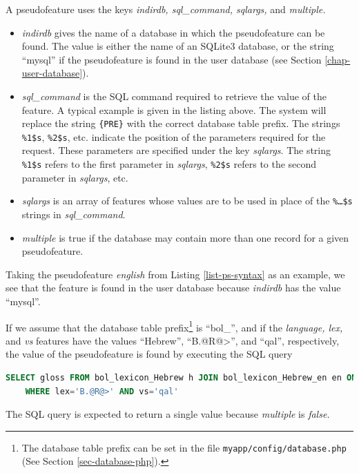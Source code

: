\documentclass[11pt,oneside,a4paper]{memoir}
\begin{document}
A pseudofeature uses the keys \emph{indirdb, sql\_command, sqlargs,} and \emph{multiple.}

\begin{itemize}
\item \emph{indirdb} gives the name of a database in which the pseudofeature can be found. The value
  is either the name of an SQLite3 database, or the string ``mysql'' if the
  pseudofeature is found in the user database (see Section
  \ref{chap-user-database}).
\item \emph{sql\_command} is the SQL command required to retrieve the value of the feature. A
  typical example is given in the listing above. The system will replace the string
  \texttt{\{PRE\}} with the correct database table prefix. The strings \texttt{\%1\$s}, \texttt{\%2\$s}, etc.
  indicate the position of the parameters required for the request. These parameters are specified
  under the key \emph{sqlargs}. The string \texttt{\%1\$s} refers to the first parameter in
  \emph{sqlargs}, \texttt{\%2\$s} refers to the second parameter in \emph{sqlargs}, etc.
\item \emph{sqlargs} is an array of features whose values are to be used in place of the
  \texttt{\%\ldots\$s} strings in \emph{sql\_command}.
\item \emph{multiple} is true if the database may contain more than one record for a given pseudofeature.
\end{itemize}

Taking the pseudofeature \emph{english} from Listing \ref{list-ps-syntax} as an example, we see that
the feature is found in the user database because \emph{indirdb} has the value ``mysql''.

If we assume that the database table prefix\footnote{The database table prefix can be set in the
  file \texttt{myapp/config/database.php} (See Section \ref{sec-database-php}).} is ``bol\_'', and
if the \emph{language, lex,} and \emph{vs} features have the values ``Hebrew'', ``B.@R@>'', and  ``qal'', respectively,
the value of the pseudofeature is found by executing the SQL query

\begin{lstlisting}[language=SQL]
SELECT gloss FROM bol_lexicon_Hebrew h JOIN bol_lexicon_Hebrew_en en ON en.lex_id=h.id
    WHERE lex='B.@R@>' AND vs='qal'
\end{lstlisting}


The SQL query is expected to return a single value because \emph{multiple} is \emph{false.}
\end{document}

